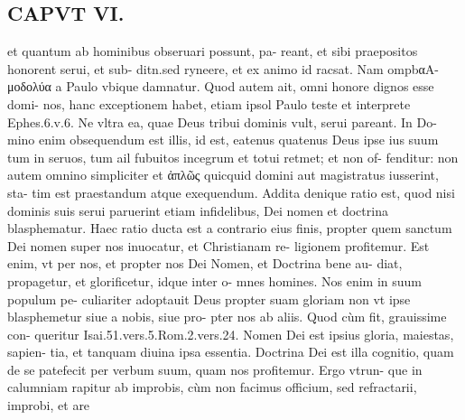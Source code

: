 \documentclass{article}
\begin{document}
\begin{pages}
\section*{CAPVT  VI. }
\marginpar{[ p.415 ]}\pstart et quantum ab hominibus obseruari possunt, pa- reant, et sibi praepositos honorent serui, et sub- ditn.sed ryneere, et ex animo id racsat. Nam ompbαA- μοδολύα a Paulo vbique damnatur.  \pend\pstart Quod autem ait, omni honore dignos esse domi- nos, hanc exceptionem habet, etiam ipsol Paulo teste et interprete Ephes.6.v.6. Ne vltra ea, quae Deus tribui dominis vult, serui pareant. In Do- mino enim obsequendum est illis, id est, eatenus quatenus Deus ipse ius suum tum in seruos, tum ail fubuitos incegrum et totui retmet; et non of- fenditur: non autem omnino simpliciter et ἀπλῶς quicquid domini aut magistratus iusserint, sta- tim est praestandum atque exequendum.  \pend\pstart Addita denique ratio est, quod nisi dominis suis serui paruerint etiam infidelibus, Dei nomen et doctrina blasphematur. Haec ratio ducta est a contrario eius finis, propter quem sanctum Dei nomen super nos inuocatur, et Christianam re- ligionem profitemur. Est enim, vt per nos, et propter nos Dei Nomen, et Doctrina bene au- diat, propagetur, et glorificetur, idque inter o- mnes homines. Nos enim in suum populum pe- culiariter adoptauit Deus propter suam gloriam non vt ipse blasphemetur siue a nobis, siue pro- pter nos ab aliis. Quod cùm fit, grauissime con- queritur Isai.51.vers.5.Rom.2.vers.24.  \pend\pstart Nomen Dei est ipsius gloria, maiestas, sapien- tia, et tanquam diuina ipsa essentia. Doctrina Dei est illa cognitio, quam de se patefecit per verbum suum, quam nos profitemur. Ergo vtrun- que in calumniam rapitur ab improbis, cùm non facimus officium, sed refractarii, improbi, et are  \pend

\end{pages}
\end{document}

